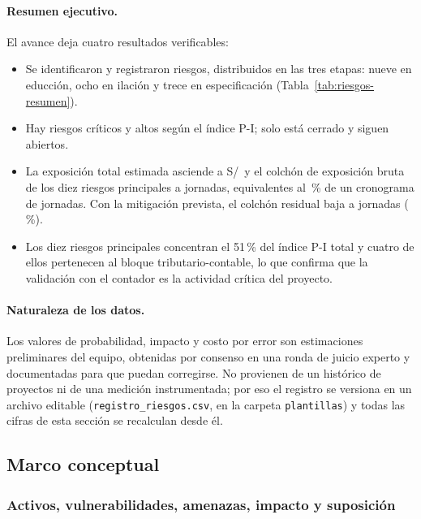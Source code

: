 \paragraph{Resumen ejecutivo.} El avance deja cuatro resultados
verificables:

\begin{itemize}
  \item Se identificaron y registraron \RiesgosTotal{} riesgos, distribuidos
  en las tres etapas: nueve en educción, ocho en ilación y trece en
  especificación (Tabla~\ref{tab:riesgos-resumen}).
  \item Hay \RiesgosCriticos{} riesgos críticos y \RiesgosAltos{} altos según
  el índice P-I; solo \RiesgosResueltos{} está cerrado y \RiesgosAbiertos{}
  siguen abiertos.
  \item La exposición total estimada asciende a S/\,\ExposicionTotal{} y el
  colchón de exposición bruta de los diez riesgos principales a
  \ColchonBruto{} jornadas, equivalentes al \ColchonPorcentaje\,\% de un
  cronograma de \JornadasProyecto{} jornadas. Con la mitigación prevista, el
  colchón residual baja a \ColchonResidual{} jornadas
  (\ColchonResidualPorcentaje\,\%).
  \item Los diez riesgos principales concentran el 51\,\% del índice P-I
  total y cuatro de ellos pertenecen al bloque tributario-contable, lo que
  confirma que la validación con el contador es la actividad crítica del
  proyecto.
\end{itemize}

\paragraph{Naturaleza de los datos.} Los valores de probabilidad, impacto y
costo por error son estimaciones preliminares del equipo, obtenidas por
consenso en una ronda de juicio experto y documentadas para que puedan
corregirse. No provienen de un histórico de proyectos ni de una medición
instrumentada; por eso el registro se versiona en un archivo editable
(\texttt{registro\_riesgos.csv}, en la carpeta \texttt{plantillas}) y todas
las cifras de esta sección se recalculan desde él.

\subsection{Marco conceptual}
\label{subsec:riesgos-marco}

\subsubsection{Activos, vulnerabilidades, amenazas, impacto y suposición}
\label{subsubsec:riesgos-conceptos}

